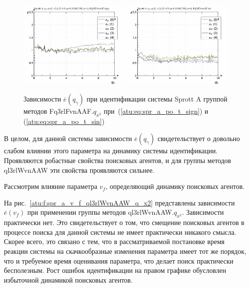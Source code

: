 \begin{figure}[htb!]
  \centerline{
    \includegraphics[width=0.49\textwidth]{p/cha/spr_a/Fq3rlFvnAAF_x2/sprott_a_id-p_q_gamma_sign.png}
    \hfill
    \includegraphics[width=0.49\textwidth]{p/cha/spr_a/Fq3rlFvnAAF_x2/sprott_a_id-p_q_gamma_sin.png}
  }
  \caption{Зависимости $\overline{e}(q_\gamma)$ при идентификации системы Sprott A группой методов Fq3rlFvnAAF.$q_{x^2}$
   при~(\ref{atu:eq:spr_a_po_t_sign}) и (\ref{atu:eq:spr_a_po_t_sin})}
  \label{atu:f:spr_a_qg_Fq3rlFvnAAF_q_x2}
\end{figure}

В целом, для данной системы
зависимости $\overline{e}( q_\gamma )$ %
свидетельствует о довольно слабом влиянии этого параметра
на динамику системы идентификации.
Проявляются робастные свойства поисковых агентов,
и для группы методов ql3rlWvnAAW эти свойства проявляются сильнее.



Рассмотрим влияние
параметра $v_f$, определяющий динамику поисковых агентов.


На рис.~\ref{atu:f:spr_a_v_f_ql3rlWvnAAW_q_x2} представлены зависимости
$\overline{e}(v_f)$ при применении группы методов ql3rlWvnAAW.$q_{x^2}$.
Зависимости практически нет. Это свидетельствует о том,
что смещение поисковых агентов в процессе поиска
для данной системы не имеет практически никакого смысла.
Скорее всего, это связано с тем, что в рассматриваемой постановке
время реакции системы на скачкообразные изменения параметра
имеет тот же порядок, что и требуемое время оценивания параметра,
что делает поиск практически бесполезным.
Рост ошибок идентификации на правом графике обусловлен
избыточной динамикой поисковых агентов.



